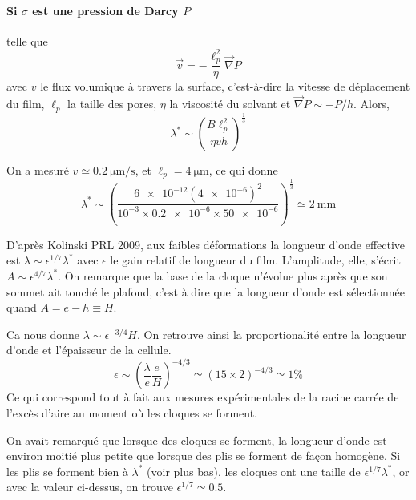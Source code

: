 \documentclass[12pt,a4paper]{article}
\begin{document}
\paragraph*{Si $\sigma$ est une pression de Darcy $P$} telle que 
\begin{equation}
\vec{v} = - \frac{\ell_p^2}{\eta}  \vec{\nabla} P
\label{eq:Darcy}
\end{equation}
avec $v$ le flux volumique à travers la surface, c'est-à-dire la vitesse de déplacement du film, $\ell_p$ la taille des pores, $\eta$ la viscosité du solvant et $\vec{\nabla} P \sim -P/h$. Alors,
\begin{equation}
\lambda^* \sim \left(\frac{B \ell_p^2}{\eta v h}\right)^\frac{1}{3}
\end{equation}

On a mesuré $v\simeq \SI{0.2}{\micro\metre\per\second}$, et $\ell_p=\SI{4}{\micro\metre}$, ce qui donne 
\begin{equation}
\lambda^* \sim \left(\frac{\num{6e-12} (\num{4e-6})^2}{10^{-3} \times \num{0.2e-6} \times \num{50e-6}}\right)^\frac{1}{3} \simeq \SI{2}{\milli\metre}
\end{equation}

D'après Kolinski PRL 2009, aux faibles déformations la longueur d'onde effective est $\lambda \sim \epsilon^{1/7} \lambda^*$ avec $\epsilon$ le gain relatif de longueur du film. L'amplitude, elle, s'écrit $A \sim \epsilon^{4/7} \lambda^*$. On remarque que la base de la cloque n'évolue plus après que son sommet ait touché le plafond, c'est à dire que la longueur d'onde est sélectionnée quand $A=e-h\equiv H$.

Ca nous donne $\lambda \sim \epsilon^{-3/4} H$. On retrouve ainsi la proportionalité entre la longueur d'onde et l'épaisseur de la cellule.
\begin{equation}
\epsilon \sim \left(\frac{\lambda}{e}\frac{e}{H}\right)^{-4/3} \simeq \left(15\times 2\right)^{-4/3} \simeq 1\%
\end{equation}
Ce qui correspond tout à fait aux mesures expérimentales de la racine carrée de l'excès d'aire au moment où les cloques se forment.

On avait remarqué que lorsque des cloques se forment, la longueur d'onde est environ moitié plus petite que lorsque des plis se forment de façon homogène. Si les plis se forment bien à $\lambda^*$ (voir plus bas), les cloques ont une taille de $\epsilon^{1/7} \lambda^*$, or avec la valeur ci-dessus, on trouve $\epsilon^{1/7}\simeq 0.5$.

\pagebreak
\end{document}
